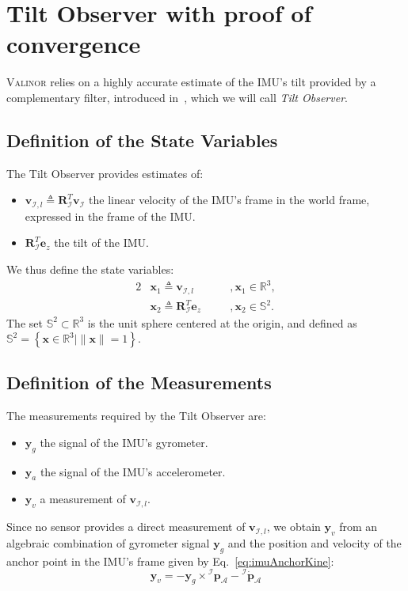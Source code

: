 \documentclass{IJCAS}
\begin{document}
\section{Tilt Observer with proof of convergence}
\label{sec:tilt_observer}
{\scshape{Valinor}} relies on a highly accurate estimate of the IMU's tilt provided by a complementary filter, introduced in~\cite{benallegue2020LyapunovStableOrientationEstimatorHumanoids}, which we will call \emph{Tilt Observer}. 

\subsection{Definition of the State Variables}
The Tilt Observer provides estimates of: 
\begin{itemize}[leftmargin=0pt]
    \item $\boldsymbol{v}_{\mathcal{I}, l} \triangleq \boldsymbol{R}^{T}_{\mathcal{I}} \boldsymbol{v}_{\mathcal{I}} $ the linear velocity of the IMU's frame in the world frame, expressed in the frame of the IMU.
    \item $\boldsymbol{R}^{T}_{\mathcal{I}} \boldsymbol{e}_z$ the tilt of the IMU.
\end{itemize}
We thus define the state variables: 
\begin{alignat}{2}
&\boldsymbol{x}_{1} \triangleq \boldsymbol{v}_{\mathcal{I}, l} \quad &&, \boldsymbol{x}_{1} \in \mathbb{R}^{3}, \label{eq:x1} \\
&\boldsymbol{x}_{2} \triangleq \boldsymbol{R}^{T}_{\mathcal{I}} \boldsymbol{e}_z \quad &&, \boldsymbol{x}_{2} \in \mathbb{S}^{2}. \label{eq:x2}
\end{alignat} 
The set $\mathbb{S}^{2} \subset \mathbb{R}^{3}$ is the unit sphere centered at the origin, and defined as $\mathbb{S}^{2} = \left\{ \boldsymbol{x} \in \mathbb{R}^{3} \vert \lVert \boldsymbol{x} \rVert=1 \right\}$.


\subsection{Definition of the Measurements} \label{subsec:tiltMeas}
The measurements required by the Tilt Observer are:
\begin{itemize}[itemsep=0pt, parsep=0.5pt, leftmargin=0pt]
    \item $\boldsymbol{y}_{g}$ the signal of the IMU's gyrometer.
    \item $\boldsymbol{y}_{a}$ the signal of the IMU's accelerometer.
    \item $\boldsymbol{y}_{v}$ a measurement of $\boldsymbol{v}_{\mathcal{I}, l}$.
\end{itemize}
Since no sensor provides a direct measurement of $\boldsymbol{v}_{\mathcal{I}, l}$, we obtain $\boldsymbol{y}_{v}$ from an algebraic combination of gyrometer signal $\boldsymbol{y}_{g}$ and the position and velocity of the anchor point in the IMU's frame given by Eq.~\eqref{eq:imuAnchorKine}:
\begin{equation}
    \boldsymbol{y}_v = - \boldsymbol{y}_{g} \times {^{\mathcal{I}}}\boldsymbol{p}_{\mathcal{A}} - {^{\mathcal{I}}} \dot{\boldsymbol{p}}_{\mathcal{A}} \label{eq:yv}
\end{equation}
\end{document}
